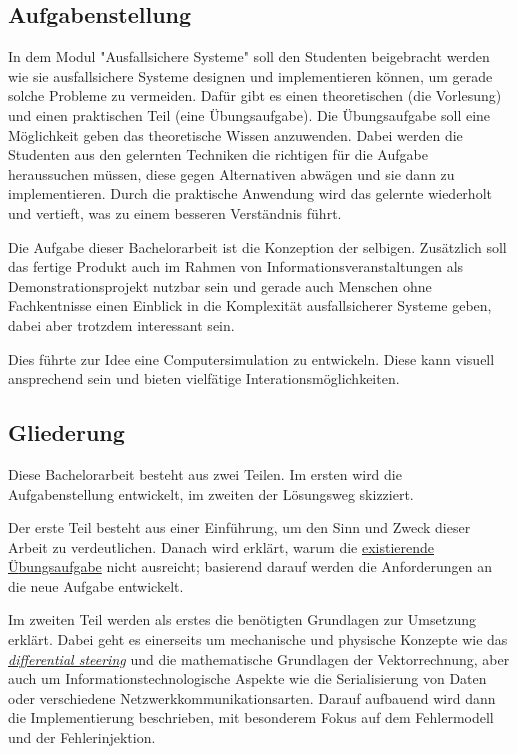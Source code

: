 \subsection{Aufgabenstellung} In dem Modul "Ausfallsichere Systeme" soll den Studenten beigebracht werden wie sie ausfallsichere Systeme
designen und implementieren k{\"{o}}nnen, um gerade solche Probleme zu vermeiden. Daf{\"{u}}r gibt es einen theoretischen (die Vorlesung) und
einen praktischen Teil (eine {\"{U}}bungsaufgabe). Die {\"{U}}bungsaufgabe soll eine M{\"{o}}glichkeit geben das theoretische Wissen anzuwenden.
Dabei werden die Studenten aus den gelernten Techniken die richtigen f{\"{u}}r die Aufgabe heraussuchen m{\"{u}}ssen, diese gegen Alternativen
abw{\"{a}}gen und sie dann zu implementieren. Durch die praktische Anwendung wird das gelernte wiederholt und vertieft, was zu einem besseren
Verst{\"{a}}ndnis f{\"{u}}hrt.

Die Aufgabe dieser Bachelorarbeit ist die Konzeption der selbigen. Zus{\"{a}}tzlich soll das fertige Produkt auch im Rahmen von Informationsveranstaltungen als Demonstrationsprojekt
nutzbar sein und gerade auch Menschen ohne Fachkentnisse einen Einblick in die Komplexit{\"{a}}t ausfallsicherer Systeme geben, dabei aber trotzdem interessant
sein.

Dies f{\"{u}}hrte zur Idee eine Computersimulation zu entwickeln. Diese kann visuell ansprechend sein und bieten vielf{\"{a}}tige Interationsm{\"{o}}glichkeiten.

\subsection{Gliederung} Diese Bachelorarbeit besteht aus zwei Teilen. Im ersten wird die Aufgabenstellung entwickelt, im zweiten der L{\"{o}}sungsweg skizziert.

Der erste Teil besteht aus einer Einf{\"{u}}hrung, um den Sinn und Zweck dieser Arbeit zu verdeutlichen. Danach wird erkl{\"{a}}rt, warum die
\hyperref[heizung]{existierende {\"{U}}bungsaufgabe} nicht ausreicht; basierend darauf werden die Anforderungen an die neue Aufgabe entwickelt.

Im zweiten Teil werden als erstes die ben{\"{o}}tigten Grundlagen zur Umsetzung erkl{\"{a}}rt. Dabei geht es einerseits um mechanische und physische Konzepte wie das
\hyperref[diffs]{\textit{differential steering}} und die mathematische Grundlagen der Vektorrechnung, aber auch um Informationstechnologische Aspekte wie die Serialisierung von Daten oder
verschiedene Netzwerkkommunikationsarten. Darauf aufbauend wird dann die Implementierung beschrieben, mit besonderem Fokus auf dem Fehlermodell und der
Fehlerinjektion.

